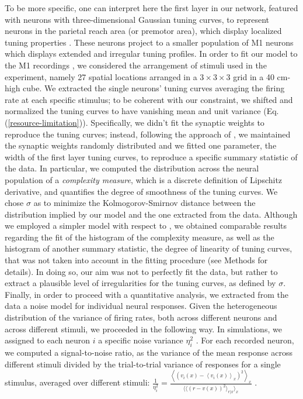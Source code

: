 \documentclass[a4paper]{article}%
\begin{document}
To be more specific, one can interpret here the first layer in our network, featured with neurons with three-dimensional Gaussian tuning curves, to
represent neurons in the parietal reach area (or premotor area), which
display localized tuning properties \cite[]{Andersen1985EncodingNeurons}. These
neurons project to a smaller population of M1 neurons which displays extended
and irregular tuning profiles. In order to fit our model to the M1 recordings
\cite[]{Lalazar2016TuningConnectivity}, we considered the arrangement of stimuli
used in the experiment, namely 27 spatial locations arranged in a
$3\times3\times3$ grid in a 40 cm-high cube. We extracted the single neurons' tuning curves averaging the firing rate at each specific stimulus; to be coherent with our constraint, we shifted and normalized the tuning curves to have vanishing mean and unit variance (Eq. (\ref{resource-limitation})). Specifically, we didn't fit the synaptic weights to reproduce the tuning curves; instead, following the approach of \cite{Lalazar2016TuningConnectivity,Arakaki2019InferringCurvesb}, we maintained the synaptic weights randomly distributed and we fitted one parameter, the width of the first layer tuning curves, to reproduce a specific summary statistic of the data. In particular, we computed the distribution across the neural population of a \textit{complexity measure}, which is a discrete definition of Lipschitz derivative, and quantifies the degree of smoothness of the tuning curves. We chose $\sigma$ as to minimize the Kolmogorov-Smirnov distance between the distribution implied by our model and the one extracted from the data. Although we employed a simpler model with respect to \cite{Lalazar2016TuningConnectivity}, we obtained comparable results regarding the fit of the histogram of the complexity measure, as well as the histogram of another summary statistic, the degree of linearity of tuning curves, that was not taken into account in the fitting procedure (see Methods for details). In doing so, our aim was not to perfectly fit the data, but rather to extract a plausible level of irregularities for the tuning curves, as defined by $\sigma$.
Finally, in order to proceed with a quantitative analysis, we extracted from the data a noise model for individual neural responses. Given the heterogeneous distribution of the variance of firing rates, both across different neurons and across different stimuli, we proceeded in the following way.
In simulations, we assigned to each neuron $i$ a specific noise variance $\eta_i^2$ . For each recorded neuron, we computed a signal-to-noise ratio, as the variance of the mean response across different stimuli divided by the trial-to-trial variance of responses for a single stimulus, averaged over different stimuli: $\frac{1}{\eta_i^2} = \frac{\left\langle \left(v_i(x) -\left\langle v_i(x)\right\rangle_x\right)^2\right\rangle_x}{\big \langle \langle (r-v(x))^2\rangle_{r|x} \big \rangle_x}$ . 
\end{document}
